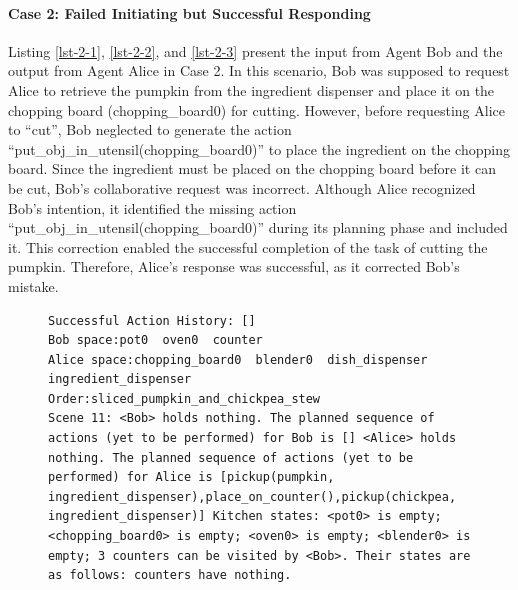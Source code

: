 \documentclass[11pt]{article}
\begin{document}
\paragraph{Case 2: Failed Initiating but Successful Responding}

Listing \ref{lst-2-1}, \ref{lst-2-2}, and \ref{lst-2-3} present the input from Agent Bob and the output from Agent Alice in Case 2. In this scenario, Bob was supposed to request Alice to retrieve the pumpkin from the ingredient dispenser and place it on the chopping board (chopping\_board0) for cutting. However, before requesting Alice to ``cut'', Bob neglected to generate the action ``put\_obj\_in\_utensil(chopping\_board0)'' to place the ingredient on the chopping board. Since the ingredient must be placed on the chopping board before it can be cut, Bob's collaborative request was incorrect. Although Alice recognized Bob’s intention, it identified the missing action ``put\_obj\_in\_utensil(chopping\_board0)'' during its planning phase and included it. This correction enabled the successful completion of the task of cutting the pumpkin. Therefore, Alice's response was successful, as it corrected Bob's mistake.

\begin{figure}[H]

\begin{lstlisting}[caption={Case 2 Agent Bob's input},label={lst-2-1}]
Successful Action History: []
Bob space:pot0  oven0  counter 
Alice space:chopping_board0  blender0  dish_dispenser  ingredient_dispenser
Order:sliced_pumpkin_and_chickpea_stew
Scene 11: <Bob> holds nothing. The planned sequence of actions (yet to be performed) for Bob is [] <Alice> holds nothing. The planned sequence of actions (yet to be performed) for Alice is [pickup(pumpkin, ingredient_dispenser),place_on_counter(),pickup(chickpea, ingredient_dispenser)] Kitchen states: <pot0> is empty; <chopping_board0> is empty; <oven0> is empty; <blender0> is empty; 3 counters can be visited by <Bob>. Their states are as follows: counters have nothing.

\end{lstlisting}
\end{figure}
\end{document}
